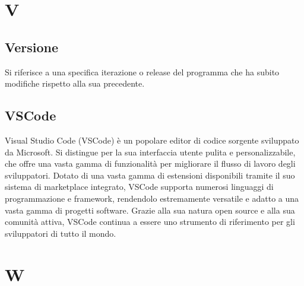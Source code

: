\documentclass{article}
\begin{document}
\section{V}
\subsection{Versione}
Si riferisce a una specifica iterazione o release del programma che ha subito modifiche rispetto alla sua precedente.

\subsection{VSCode}
Visual Studio Code (VSCode) è un popolare editor di codice sorgente sviluppato da Microsoft. Si distingue per la sua interfaccia utente pulita e personalizzabile, che offre una vasta gamma di funzionalità per migliorare il flusso di lavoro degli sviluppatori. Dotato di una vasta gamma di estensioni disponibili tramite il suo sistema di marketplace integrato, VSCode supporta numerosi linguaggi di programmazione e framework, rendendolo estremamente versatile e adatto a una vasta gamma di progetti software. Grazie alla sua natura open source e alla sua comunità attiva, VSCode continua a essere uno strumento di riferimento per gli sviluppatori di tutto il mondo.

\section{W}
\end{document}
